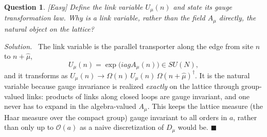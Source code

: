 \documentclass[11pt]{article}
\newcommand{\diff}[1]{\textcolor{blue!60!black}{\footnotesize\textsf{[#1]}}\quad}
\newtheorem{question}{Question}
\newenvironment{solution}{\par\smallskip\noindent\textit{Solution.}\ }{\hfill$\blacksquare$\par\smallskip}
\begin{document}
\begin{question}
\diff{Easy} Define the link variable $U_\mu(n)$ and state its gauge transformation law. Why is a link variable, rather than the field $A_\mu$ directly, the natural object on the lattice?
\end{question}
\begin{solution}
The link variable is the parallel transporter along the edge from site $n$ to $n+\hat\mu$,
\begin{equation}
U_\mu(n) = \exp\!\big(i a g A_\mu(n)\big) \in SU(N),
\end{equation}
and it transforms as $U_\mu(n) \to \Omega(n)\, U_\mu(n)\, \Omega(n+\hat\mu)^\dagger$. It is the natural variable because gauge invariance is realized \emph{exactly} on the lattice through group-valued links: products of links along closed loops are gauge invariant, and one never has to expand in the algebra-valued $A_\mu$. This keeps the lattice measure (the Haar measure over the compact group) gauge invariant to all orders in $a$, rather than only up to $\mathcal{O}(a)$ as a naive discretization of $D_\mu$ would be.
\end{solution}
\end{document}
